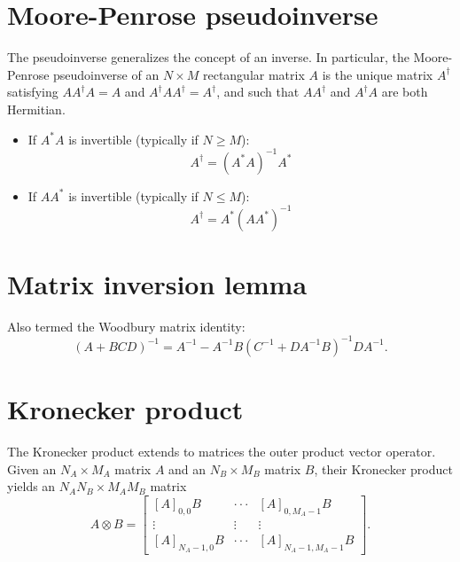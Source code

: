 \documentclass[a4paper, 12pt]{book}
\begin{document}
\section{Moore-Penrose pseudoinverse}
The pseudoinverse generalizes the concept of an inverse. In particular, the Moore-Penrose pseudoinverse of an $N \times M$ rectangular matrix $A$ is the unique matrix $A^{\dagger}$ satisfying $AA^{\dagger}A=A$ and $A^{\dagger}AA^{\dagger}=A^{\dagger}$, and such that $AA^{\dagger}$ and $A^{\dagger}A$ are both Hermitian.

\begin{itemize}
    \item If $A^{*}A$ is invertible (typically if $N \ge M$):
    \begin{equation}
        A^{\dagger}=(A^{*}A)^{-1}A^{*} \tag{B.32}
    \end{equation}
    \item If $AA^{*}$ is invertible (typically if $N \le M$):
    \begin{equation}
        A^{\dagger}=A^{*}(AA^{*})^{-1} \tag{B.33}
    \end{equation}
\end{itemize}

\section{Matrix inversion lemma}
Also termed the Woodbury matrix identity:
\begin{equation}
    (A+BCD)^{-1} = A^{-1} - A^{-1}B(C^{-1}+DA^{-1}B)^{-1}DA^{-1}. \tag{B.34}
\end{equation}

\section{Kronecker product}
The Kronecker product extends to matrices the outer product vector operator. Given an $N_{A} \times M_{A}$ matrix $A$ and an $N_{B} \times M_{B}$ matrix $B$, their Kronecker product yields an $N_{A}N_{B} \times M_{A}M_{B}$ matrix
\begin{equation}
    A \otimes B = 
    \begin{bmatrix}
    [A]_{0,0}B & \cdot\cdot\cdot & [A]_{0,M_{A}-1}B \\
    \vdots & \vdots & \vdots \\
    [A]_{N_{A}-1,0}B & \cdot\cdot\cdot & [A]_{N_{A}-1,M_{A}-1}B
    \end{bmatrix}. \tag{B.35}
\end{equation}
\end{document}
